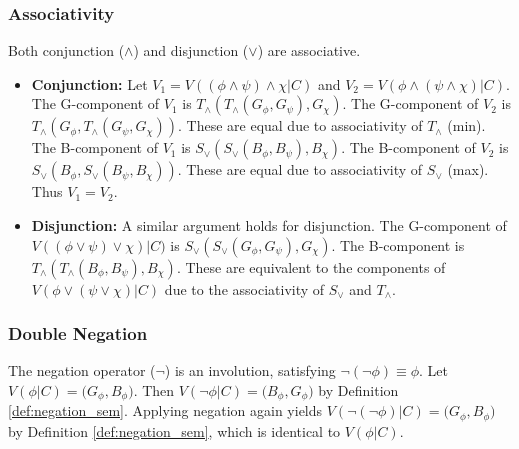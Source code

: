 \documentclass[11pt]{article}
\newcommand{\GB}[2]{\bigl(#1,#2\bigr)} %
\theoremstyle{remark}
\begin{document}
\subsubsection{Associativity}
Both conjunction ($\land$) and disjunction ($\lor$) are associative.
\begin{itemize}
    \item \textbf{Conjunction:} Let $V_1 = V((\phi \land \psi) \land \chi|C)$ and $V_2 = V(\phi \land (\psi \land \chi)|C)$.
    The G-component of $V_1$ is $T_\wedge(T_\wedge(G_\phi, G_\psi), G_\chi)$. The G-component of $V_2$ is $T_\wedge(G_\phi, T_\wedge(G_\psi, G_\chi))$. These are equal due to associativity of $T_\wedge$ (min).
    The B-component of $V_1$ is $S_\vee(S_\vee(B_\phi, B_\psi), B_\chi)$. The B-component of $V_2$ is $S_\vee(B_\phi, S_\vee(B_\psi, B_\chi))$. These are equal due to associativity of $S_\vee$ (max). Thus $V_1=V_2$.
    \item \textbf{Disjunction:} A similar argument holds for disjunction. The G-component of $V((\phi \lor \psi) \lor \chi)|C)$ is $S_\vee(S_\vee(G_\phi, G_\psi), G_\chi)$. The B-component is $T_\wedge(T_\wedge(B_\phi, B_\psi), B_\chi)$. These are equivalent to the components of $V(\phi \lor (\psi \lor \chi)|C)$ due to the associativity of $S_\vee$ and $T_\wedge$.
\end{itemize}

\subsubsection{Double Negation}
The negation operator ($\neg$) is an involution, satisfying $\neg(\neg\phi) \equiv \phi$.
Let $V(\phi|C) = \GB{G_\phi}{B_\phi}$.
Then $V(\neg\phi|C) = \GB{B_\phi}{G_\phi}$ by Definition \ref{def:negation_sem}.
Applying negation again yields $V(\neg(\neg\phi)|C) = \GB{G_\phi}{B_\phi}$ by Definition \ref{def:negation_sem}, which is identical to $V(\phi|C)$.
\end{document}
